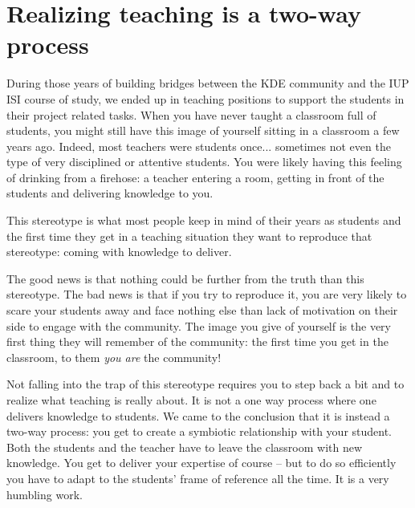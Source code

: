 \section*{Realizing teaching is a two-way process}
During those years of building bridges between the KDE community and the IUP ISI
course of study, we ended up in teaching positions to support the students in
their project related tasks. When you have never taught a classroom
full of students, you might still have this image of yourself sitting in a
classroom a few years ago. Indeed, most teachers were students once... sometimes
not even the type of very disciplined or attentive students. You were likely
having this feeling of drinking from a firehose: a teacher entering a room,
getting in front of the students and delivering knowledge to you.

This stereotype is what most people keep in mind of their years as students and
the first time they get in a teaching situation they want to reproduce that
stereotype: coming with knowledge to deliver.

The good news is that nothing could be further from the truth than this
stereotype. The bad news is that if you try to reproduce it, you are very likely
to scare your students away and face nothing else than lack of motivation on
their side to engage with the community. The image you give of yourself is the
very first thing they will remember of the community: the first time you get in
the classroom, to them \emph{you are} the community!

Not falling into the trap of this stereotype requires you to step back a bit and to realize what teaching is really about. It is not a one way process where one
delivers knowledge to students. We came to the conclusion that it is instead a
two-way process: you get to create a symbiotic relationship with your student.
Both the students and the teacher have to leave the classroom with new
knowledge. You get to deliver your expertise of course -- but to do so efficiently
you have to adapt to the students' frame of reference all the time. It is a very
humbling work.

